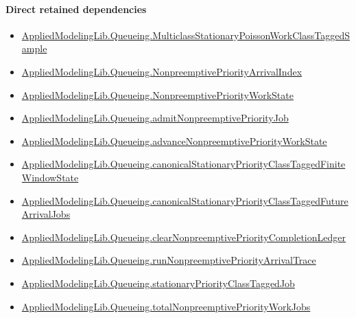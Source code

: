 \documentclass[10pt]{article}
\begin{document}
\paragraph{Direct retained dependencies}
\begin{itemize}\raggedright
\item \hyperlink{library-prerequisite-755cdb28ceaf46d2}{Applied\allowbreak{}Modeling\allowbreak{}Lib.\allowbreak{}Queueing.\allowbreak{}Multiclass\allowbreak{}Stationary\allowbreak{}Poisson\allowbreak{}Work\allowbreak{}Class\allowbreak{}Tagged\allowbreak{}Sample}
\item \hyperlink{governing-declaration-5d3724f4dc832d77}{Applied\allowbreak{}Modeling\allowbreak{}Lib.\allowbreak{}Queueing.\allowbreak{}Nonpreemptive\allowbreak{}Priority\allowbreak{}Arrival\allowbreak{}Index}
\item \hyperlink{library-prerequisite-e68cb5fce009ec53}{Applied\allowbreak{}Modeling\allowbreak{}Lib.\allowbreak{}Queueing.\allowbreak{}Nonpreemptive\allowbreak{}Priority\allowbreak{}Work\allowbreak{}State}
\item \hyperlink{library-prerequisite-837de7f0cc179814}{Applied\allowbreak{}Modeling\allowbreak{}Lib.\allowbreak{}Queueing.\allowbreak{}admit\allowbreak{}Nonpreemptive\allowbreak{}Priority\allowbreak{}Job}
\item \hyperlink{library-prerequisite-96200a424cf39dee}{Applied\allowbreak{}Modeling\allowbreak{}Lib.\allowbreak{}Queueing.\allowbreak{}advance\allowbreak{}Nonpreemptive\allowbreak{}Priority\allowbreak{}Work\allowbreak{}State}
\item \hyperlink{library-prerequisite-6e4e64d50452f911}{Applied\allowbreak{}Modeling\allowbreak{}Lib.\allowbreak{}Queueing.\allowbreak{}canonical\allowbreak{}Stationary\allowbreak{}Priority\allowbreak{}Class\allowbreak{}Tagged\allowbreak{}Finite\allowbreak{}Window\allowbreak{}State}
\item \hyperlink{library-prerequisite-bb4b8c8010d5959b}{Applied\allowbreak{}Modeling\allowbreak{}Lib.\allowbreak{}Queueing.\allowbreak{}canonical\allowbreak{}Stationary\allowbreak{}Priority\allowbreak{}Class\allowbreak{}Tagged\allowbreak{}Future\allowbreak{}Arrival\allowbreak{}Jobs}
\item \hyperlink{library-prerequisite-cc744f6520cc7734}{Applied\allowbreak{}Modeling\allowbreak{}Lib.\allowbreak{}Queueing.\allowbreak{}clear\allowbreak{}Nonpreemptive\allowbreak{}Priority\allowbreak{}Completion\allowbreak{}Ledger}
\item \hyperlink{library-prerequisite-74e6067041d9c8dc}{Applied\allowbreak{}Modeling\allowbreak{}Lib.\allowbreak{}Queueing.\allowbreak{}run\allowbreak{}Nonpreemptive\allowbreak{}Priority\allowbreak{}Arrival\allowbreak{}Trace}
\item \hyperlink{library-prerequisite-3702583c174721c0}{Applied\allowbreak{}Modeling\allowbreak{}Lib.\allowbreak{}Queueing.\allowbreak{}stationary\allowbreak{}Priority\allowbreak{}Class\allowbreak{}Tagged\allowbreak{}Job}
\item \hyperlink{library-prerequisite-d49e277073e052d4}{Applied\allowbreak{}Modeling\allowbreak{}Lib.\allowbreak{}Queueing.\allowbreak{}total\allowbreak{}Nonpreemptive\allowbreak{}Priority\allowbreak{}Work\allowbreak{}Jobs}
\end{itemize}
\end{document}
